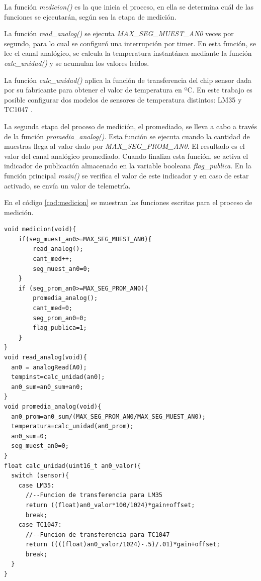 La función \textit{medicion()} es la que inicia el proceso, en ella se determina cuál de las funciones se ejecutarán, según sea la etapa de medición.

La función \textit{read\_analog()} se ejecuta \textit{MAX\_SEG\_MUEST\_AN0} veces por segundo, para lo cual se configuró una interrupción por timer. En esta función, se lee el canal analógico, se calcula la temperatura instantánea mediante la función \textit{calc\_unidad()} y se acumulan los valores leídos.

La función \textit{calc\_unidad()} aplica la función de transferencia del chip sensor dada por su fabricante para obtener el valor de temperatura en ºC. En este trabajo es posible configurar dos modelos de sensores de temperatura distintos: LM35 \citep{LM35} y TC1047 \citep{TC1047}.

La segunda etapa del proceso de medición, el promediado, se lleva a cabo a través de la función \textit{promedia\_analog()}. Esta función se ejecuta cuando la cantidad de muestras llega al valor dado por  \textit{MAX\_SEG\_PROM\_AN0}. El resultado es el valor del canal analógico promediado. Cuando finaliza esta función, se activa el indicador de publicación almacenado en la variable booleana \textit{flag\_publica}. En la función principal \textit{main()} se verifica el valor de este indicador y en caso de estar activado, se envía  un valor de telemetría.


En el código \ref{cod:medicion} se muestran las funciones escritas para el proceso de medición.

\begin{lstlisting}[caption={Funciones para el proceso de medición.},label={cod:medicion}]
void medicion(void){
    if(seg_muest_an0>=MAX_SEG_MUEST_AN0){
        read_analog();
        cant_med++;
        seg_muest_an0=0;
    }
    if (seg_prom_an0>=MAX_SEG_PROM_AN0){
        promedia_analog();
        cant_med=0;
        seg_prom_an0=0;
        flag_publica=1;
    }
}
void read_analog(void){
  an0 = analogRead(A0);
  tempinst=calc_unidad(an0);
  an0_sum=an0_sum+an0;
}
void promedia_analog(void){
  an0_prom=an0_sum/(MAX_SEG_PROM_AN0/MAX_SEG_MUEST_AN0);
  temperatura=calc_unidad(an0_prom);
  an0_sum=0;
  seg_muest_an0=0;
}
float calc_unidad(uint16_t an0_valor){
  switch (sensor){
    case LM35:
      //--Funcion de transferencia para LM35
      return ((float)an0_valor*100/1024)*gain+offset; 
      break;
    case TC1047:
      //--Funcion de transferencia para TC1047
      return ((((float)an0_valor/1024)-.5)/.01)*gain+offset;
      break;
  }
}
\end{lstlisting}


